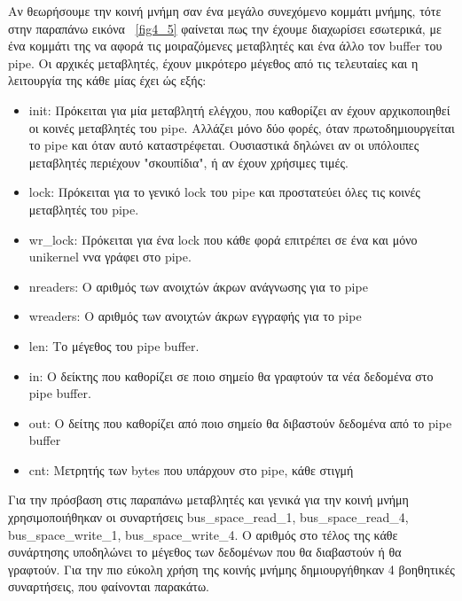 Αν θεωρήσουμε την κοινή μνήμη σαν ένα μεγάλο συνεχόμενο κομμάτι μνήμης, τότε
στην παραπάνω εικόνα ~\ref{fig4_5} φαίνεται πως την έχουμε διαχωρίσει εσωτερικά,
με ένα κομμάτι της να αφορά τις μοιραζόμενες μεταβλητές και ένα άλλο τον buffer
του pipe. Οι αρχικές μεταβλητές, έχουν μικρότερο μέγεθος από τις τελευταίες και
η λειτουργία της κάθε μίας έχει ώς εξής:
\begin{itemize}
	\item init: Πρόκειται για μία μεταβλητή ελέγχου, που καθορίζει αν έχουν
		αρχικοποιηθεί οι κοινές μεταβλητές του pipe. Αλλάζει μόνο δύο
		φορές, όταν πρωτοδημιουργείται το pipe και όταν αυτό
		καταστρέφεται. Ουσιαστικά δηλώνει αν οι υπόλοιπες μεταβλητές
		περιέχουν "σκουπίδια", ή αν έχουν χρήσιμες τιμές.
	\item lock: Πρόκειται για το γενικό lock του pipe και προστατεύει όλες
		τις κοινές μεταβλητές του pipe. 
	\item wr\_lock: Πρόκειται για ένα lock που κάθε φορά επιτρέπει σε ένα
		και μόνο unikernel ννα γράφει στο pipe. 
	\item nreaders: Ο αριθμός των ανοιχτών άκρων ανάγνωσης για το pipe
	\item wreaders: Ο αριθμός των ανοιχτών άκρων εγγραφής για το pipe
	\item len: Το μέγεθος του pipe buffer.
	\item in: Ο δείκτης που καθορίζει σε ποιο σημείο θα γραφτούν τα νέα
		δεδομένα στο pipe buffer.
	\item out: Ο δείτης που καθορίζει από ποιο σημείο θα διβαστούν δεδομένα
		από το pipe buffer
	\item cnt: Μετρητής των bytes που υπάρχουν στο pipe, κάθε στιγμή
\end{itemize}

Για την πρόσβαση στις παραπάνω μεταβλητές και γενικά για την κοινή μνήμη
χρησιμοποιήθηκαν οι συναρτήσεις bus\_space\_read\_1, bus\_space\_read\_4,
bus\_space\_write\_1, bus\_space\_write\_4. Ο αριθμός στο τέλος της κάθε
συνάρτησης υποδηλώνει το μέγεθος των δεδομένων που θα διαβαστούν ή θα γραφτούν.
Για την πιο εύκολη χρήση της κοινής μνήμης δημιουργήθηκαν 4 βοηθητικές
συναρτήσεις, που φαίνονται παρακάτω. 

